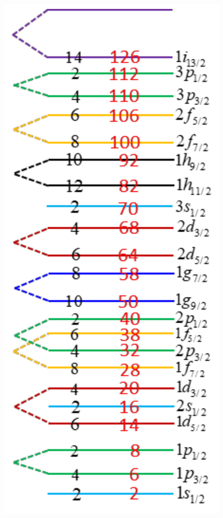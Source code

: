 \begin{marginfigure}
	\includegraphics{figs/magic-numbers-shell-model}
	\label{fig:magic-numbers-shell-model}
\end{marginfigure}
